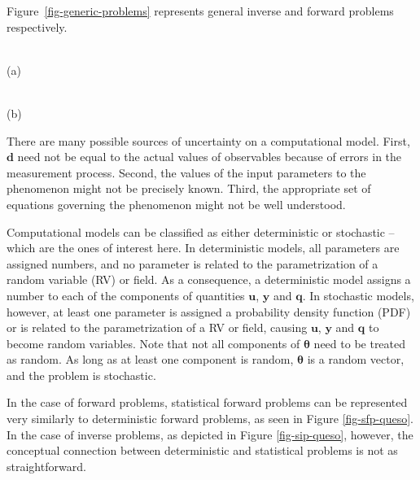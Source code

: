 
Figure~\ref{fig-generic-problems} represents general inverse and forward problems respectively.
%
\begin{figure*}[htb]
\begin{minipage}[b]{0.5\textwidth}
\\
\centering
(a)
\end{minipage}%
\begin{minipage}[b]{0.5\textwidth}
\\
\centering 
(b)
\end{minipage}
\vspace{-20pt}
\caption{The representation of (a) a generic forward problem and (b) a generic inverse problem.}
\label{fig-generic-problems}
\end{figure*}


There are many possible sources of uncertainty on a computational model. %
First, $\mathbf{d}$ need not be equal to the actual values of observables because of errors in the measurement process. Second, the values of the input parameters to the phenomenon might not be precisely known. Third, the appropriate set of
equations governing the phenomenon might not be well understood. 

Computational models can be classified as either deterministic or stochastic -- which are the ones of interest here.  In deterministic models, all parameters are assigned numbers, and no parameter is related to the parametrization of a random variable (RV) or field. As a
consequence, a deterministic model assigns a number to each of the components of quantities $\mathbf{u}$, $\mathbf{y}$ and $\mathbf{q}$. In stochastic models, however, at least one parameter is assigned a probability density function (PDF) or is related to the parametrization of a RV or field, causing $\mathbf{u}$, $\mathbf{y}$ and $\mathbf{q}$ to become random variables.  Note that not all components of $\boldsymbol{\theta}$ need to be treated as random. As long as at least one component is random, $\boldsymbol{\theta}$ is a random vector, and the problem is stochastic.



In the case of forward problems, statistical forward problems can be represented very similarly to deterministic forward problems,
as seen in Figure \ref{fig-sfp-queso}.
In the case of inverse problems, as depicted in Figure \ref{fig-sip-queso}, however, the conceptual connection between deterministic and statistical problems
is not as straightforward.

